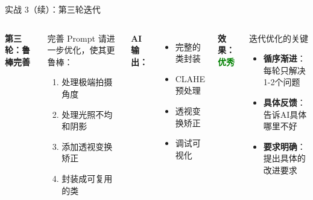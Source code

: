 \begin{frame}{实战 3（续）：第三轮迭代}
	\begin{columns}
		\textbf{第三轮：鲁棒完善}

		\begin{exampleblock}{完善 Prompt}
			请进一步优化，使其更鲁棒：
			\begin{enumerate}
				\item 处理极端拍摄角度
				\item 处理光照不均和阴影
				\item 添加透视变换矫正
				\item 封装成可复用的类
			\end{enumerate}
		\end{exampleblock}

		\textbf{AI 输出：}
		\begin{itemize}
			\item 完整的类封装
			\item CLAHE 预处理
			\item 透视变换矫正
			\item 调试可视化
		\end{itemize}

		\textbf{效果：}\textcolor{green}{\textbf{优秀}}

		\begin{block}{迭代优化的关键}
			\begin{itemize}
				\item \textbf{循序渐进}：每轮只解决1-2个问题
				\item \textbf{具体反馈}：告诉AI具体哪里不好
				\item \textbf{要求明确}：提出具体的改进要求
			\end{itemize}
		\end{block}
	\end{columns}
\end{frame}


